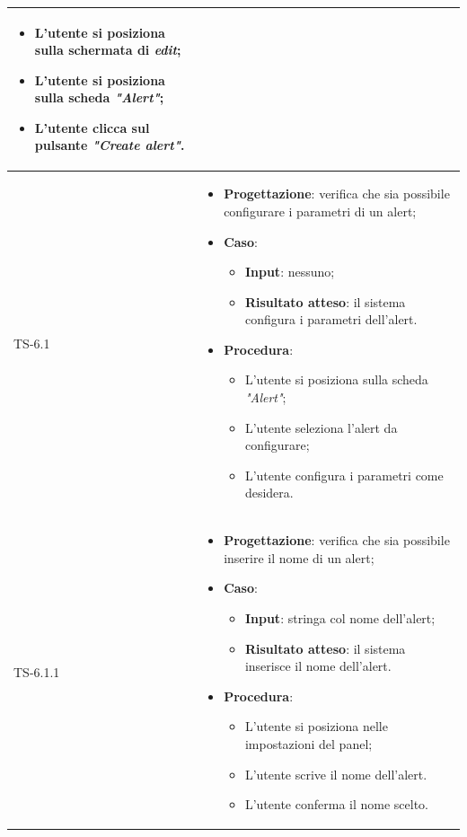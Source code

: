\begin{longtable}{|C{2.5cm}|C{13cm}|}
\begin{itemize}
\begin{itemize}
		\item L'utente si posiziona sulla schermata di \emph{edit};
		\item L'utente si posiziona sulla scheda \emph{"Alert"};
		\item L'utente clicca sul pulsante \emph{"Create alert"}.
	\end{itemize} 
\end{itemize}
	 \\
	\hline
	{TS-6.1} & 
\begin{itemize}
	\item \textbf{Progettazione}: verifica che sia possibile configurare i
	parametri di un alert;
	\item \textbf{Caso}: 
	\begin{itemize}
		\item \textbf{Input}: nessuno;
		\item \textbf{Risultato atteso}: il sistema configura i parametri dell'alert.
	\end{itemize}
	\item \textbf{Procedura}:
	\begin{itemize}
		\item L'utente si posiziona sulla scheda \emph{"Alert"};
		\item L'utente seleziona l'alert da configurare;
		\item L'utente configura i parametri come desidera.
	\end{itemize} 
\end{itemize}
	 \\
	\hline
	{TS-6.1.1} &
\begin{itemize}
	\item \textbf{Progettazione}: verifica che sia possibile inserire il nome
	di un alert;
	\item \textbf{Caso}: 
	\begin{itemize}
		\item \textbf{Input}: stringa col nome dell'alert;
		\item \textbf{Risultato atteso}: il sistema inserisce il nome dell'alert.
	\end{itemize}
	\item \textbf{Procedura}:
	\begin{itemize}
		\item L'utente si posiziona nelle impostazioni del panel;
		\item L'utente scrive il nome dell'alert.
		\item L'utente conferma il nome scelto.
	\end{itemize} 

\end{itemize}
\end{longtable}
